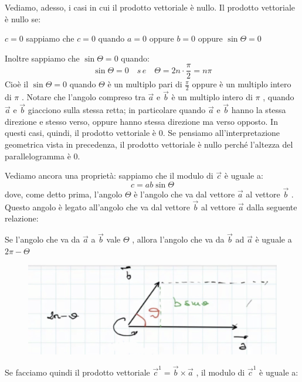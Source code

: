 \documentclass[a4paper]{book}
\begin{document}
Vediamo, adesso, i casi in cui il prodotto vettoriale è nullo.
Il prodotto vettoriale è nullo se:

$ c = 0 $ sappiamo che $ c = 0 $ quando $ a = 0 $ oppure $ b = 0 $ oppure $ \sin \Theta = 0 $

Inoltre sappiamo che $ \sin \Theta = 0 $ quando: 
$$ \sin \Theta = 0 \quad s\,e \quad \Theta = 2n \cdot \frac{\pi}{2} = n\pi $$
Cioè il $ \sin \Theta = 0 $ quando $ \Theta $ è un multiplo pari di $ \frac{\pi}{2} $ oppure è un multiplo intero di $ \pi $ . Notare che l'angolo compreso tra $ \overrightarrow{a} $ e $ \overrightarrow{b} $ è un multiplo intero di $ \pi $ , quando $\overrightarrow{a} $ e $ \overrightarrow{b} $ giacciono sulla stessa retta; in particolare quando $ \overrightarrow{a} $ e $ \overrightarrow{b} $ hanno la stessa direzione e stesso verso, oppure hanno stessa direzione ma verso opposto. In questi casi, quindi, il prodotto vettoriale è 0. Se pensiamo all'interpretazione geometrica vista in precedenza, il prodotto vettoriale è nullo perché l'altezza del parallelogramma è 0.

Vediamo ancora una proprietà: sappiamo che il modulo di $ \overrightarrow{c} $ è uguale a:
$$ c = ab \sin \Theta  $$
dove, come detto prima, l'angolo $ \Theta $ è l'angolo che va dal vettore $ \overrightarrow{a} $ al vettore $ \overrightarrow{b} $ . Questo angolo è legato all'angolo che va dal vettore $ \overrightarrow{b} $ al vettore $ \overrightarrow{a} $ dalla seguente relazione:
\newpage

Se l'angolo che va da $ \overrightarrow{a} $ a $ \overrightarrow{b} $ vale $ \Theta $ , allora l'angolo  che va da $ \overrightarrow{b} $ ad $ \overrightarrow{a} $ è uguale a $ 2 \pi - \Theta $

\begin{figure}[h]
\begin{center}
\includegraphics[width = 0.5 \textwidth]{vettoriale4}
\label{fig:vettoriale4}
\end{center}
\end{figure}

Se facciamo quindi il prodotto vettoriale $ \overrightarrow{c}^{1} =  \overrightarrow{b} \times \overrightarrow{a} $ , il modulo di $\overrightarrow{c}^{1} $  è uguale a:
\end{document}
